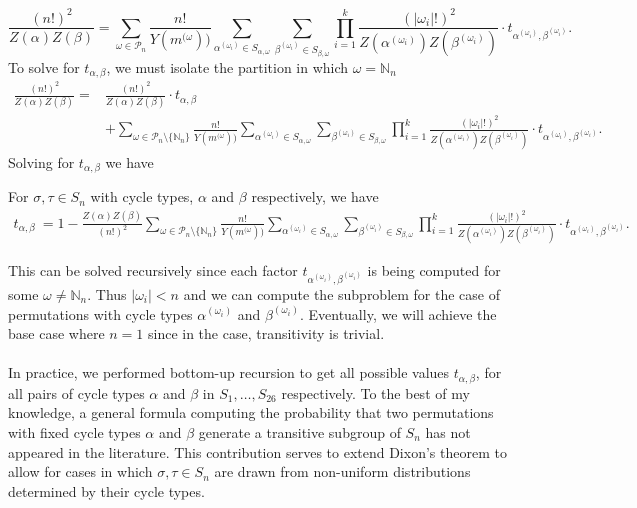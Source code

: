 \[
    \frac{(n!)^2}{Z(\alpha)Z(\beta)} = \sum_{\omega\in\mathcal{P}_n}\frac{n!}{Y(m^{(\omega}))}\sum_{\alpha^{(\omega_i)}\in S_{\alpha,\omega}}\sum_{\beta^{(\omega_i)}\in S_{\beta,\omega}}\prod_{i=1}^k
{\frac{(|\omega_i|!)^2}{Z(\alpha^{(\omega_i)})Z(\beta^{(\omega_i)})}}\cdot t_{\alpha^{(\omega_i)},\beta^{(\omega_i)}}.
\]
To solve for $t_{\alpha,\beta}$, we must isolate the partition in which $\omega=\mathbb{N}_n$
\begin{align*}
    \frac{(n!)^2}{Z(\alpha)Z(\beta)} = &\frac{(n!)^2}{Z(\alpha)Z(\beta)}\cdot t_{\alpha, \beta}\\
    &+ \sum_{\omega\in\mathcal{P}_n \setminus \{\mathbb{N}_n\}}\frac{n!}{Y(m^{(\omega}))}\sum_{\alpha^{(\omega_i)}\in S_{\alpha,\omega}}\sum_{\beta^{(\omega_i)}\in S_{\beta,\omega}}\prod_{i=1}^k
{\frac{(|\omega_i|!)^2}{Z(\alpha^{(\omega_i)})Z(\beta^{(\omega_i)})}}\cdot t_{\alpha^{(\omega_i)},\beta^{(\omega_i)}}.
\end{align*}
Solving for $t_{\alpha,\beta}$ we have
\begin{theorem}
For $\sigma,\tau\in S_n$ with cycle types, $\alpha$ and $\beta$ respectively, we have 
\begin{align*}
    t_{\alpha, \beta}\ = 1 - \frac{Z(\alpha)Z(\beta)}{(n!)^2}\sum_{\omega\in\mathcal{P}_n \setminus\{\mathbb{N}_n\}}\frac{n!}{Y(m^{(\omega}))}\sum_{\alpha^{(\omega_i)}\in S_{\alpha,\omega}}\sum_{\beta^{(\omega_i)}\in S_{\beta,\omega}}\prod_{i=1}^k
{\frac{(|\omega_i|!)^2}{Z(\alpha^{(\omega_i)})Z(\beta^{(\omega_i)})}}\cdot t_{\alpha^{(\omega_i)},\beta^{(\omega_i)}}.
\end{align*}
\end{theorem}
\noindent This can be solved recursively since each factor $t_{\alpha^{(\omega_i)},\beta^{(\omega_i)}}$ is being computed for some $\omega \ne \mathbb{N}_n$. Thus $|\omega_i| < n$ and we can compute the subproblem for the case of permutations with cycle types $\alpha^{(\omega_i)}$ and $\beta^{(\omega_i)}$. Eventually, we will achieve the base case where $n = 1$ since in the case, transitivity is trivial. 
\\\\In practice, we performed bottom-up recursion to get all possible values $t_{\alpha,\beta}$, for all pairs of cycle types $\alpha$ and $\beta$ in $S_1, \dots, S_{26}$ respectively. To the best of my knowledge, a general formula computing the probability that two permutations with fixed cycle types $\alpha$ and $\beta$ generate a transitive subgroup of $S_n$ has not appeared in the literature. This contribution serves to extend Dixon's theorem to allow for cases in which $\sigma,\tau\in S_n$ are drawn from non-uniform distributions determined by their cycle types.

